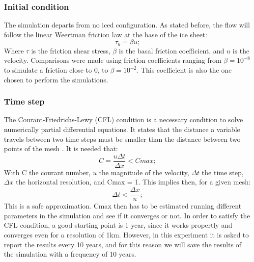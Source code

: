 \documentclass[a4paper,12pt]{article}
\begin{document}
\subsubsection{Initial condition}
The simulation departs from no iced configuration. 
As stated before, the flow will follow the linear Weertman friction law at the base of the ice sheet:
\begin{equation}
	\tau_b=\beta u;
\end{equation}
Where $\tau$ is the friction shear stress, $\beta$ is the basal friction coefficient, and $u$ is the velocity.
Comparisons were made using friction coefficients ranging from $\beta=10^{-8}$ to simulate a friction close to 0, to $\beta=10^{-2}$. This coefficient is also the one chosen to perform the simulations. 
\subsubsection{Time step}
The Courant-Friedrichs-Lewy (CFL) condition is a necessary condition to solve numerically partial differential equations. It states that the distance a variable travels between two time steps must be smaller than the distance between two points of the mesh \cite[]{courant1967partial}. It is needed that:
\begin{equation}
	C=\frac{u\Delta t}{\Delta x}<Cmax;
\end{equation}
With C the courant number, $u$ the magnitude of the velocity, $\Delta t$ the time step, $\Delta x$ the horizontal resolution, and Cmax = 1. This implies then, for a given mesh:
\begin{equation}
	\Delta t < \frac{\Delta x}{u};
\end{equation}
This is a safe approximation. Cmax then has to be estimated running different parameters in the simulation and see if it converges or not. In order to satisfy the CFL condition, a good starting point is 1 year, since it works propertly and converges even for a resolution of 1km.
However, in this experiment it is asked to report the results every 10 years, and for this reason we will save the results of the simulation with a frequency of 10 years. 
\end{document}

